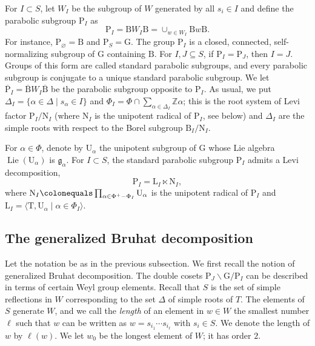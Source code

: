 \documentclass{amsart}
\theoremstyle{remark}
\numberwithin{equation}{subsection}
\newcommand{\Z}{\ZZ}
\newcommand{\ZZ}{{\mathbb Z}}
\newcommand{\ol}{\overline}
\newcommand{\sub}{\subseteq}
\DeclareMathOperator\Lie{Lie}
\newcommand{\defeq}{\colonequals}
\renewcommand{\(}{\left(}
\renewcommand{\)}{\right)}
\begin{document}
For  $I\subset S$, let $W_I$ be the subgroup of $W$ generated by all $s_i \in I$ and define the parabolic subgroup $\mathrm{P}_I$ as
$$
\mathrm{P}_I=\mathrm{B} W_I \mathrm{B}=\cup_{w\in W_I} \mathrm{B}w\mathrm{B}.
$$
For instance, $\mathrm{P}_\varnothing = \mathrm{B}$ and $\mathrm{P}_S = \mathrm{G}$. 
The group $\mathrm{P}_I$ is a closed, connected, self-normalizing subgroup of $\mathrm{G}$ containing $\mathrm{B}$. For $I,J\sub S$, if $\mathrm{P}_I=\mathrm{P}_J$, then $I=J$. Groups of this form are called standard parabolic subgroups, and every parabolic subgroup is conjugate to a unique standard parabolic subgroup. We let $\ol{\mathrm{P}}_I = \ol{\mathrm{B}} W_I \ol{\mathrm{B}}$ be the parabolic subgroup opposite to $\mathrm{P}_I$. As usual, we put $\Delta_{I}=\{\alpha \in \Delta \mid s_{\alpha}\in I \}$ and $\Phi_{I}=\Phi \cap \sum_{\alpha\in \Delta_{I}}\Z \alpha$; this is the root system of Levi factor $\mathrm{P}_{I}/\mathrm{N}_{I}$ (where $\mathrm{N}_{I}$ is the unipotent radical of $\mathrm{P}_{I}$, see below) and $\Delta_{I}$ are the simple roots with respect to the Borel subgroup $\mathrm{B}_{I}/\mathrm{N}_{I}$.

For $\alpha\in \Phi$, denote by $\mathrm{U}_{\alpha}$ the unipotent subgroup of $\mathrm{G}$ whose Lie algebra $\Lie(\mathrm{U}_\alpha)$ is $\mathfrak{g}_{\alpha}$. For $I\subset S$, the standard parabolic subgroup $\mathrm{P}_I$ admits a Levi decomposition, $$\mathrm{P}_I=\mathrm{L}_I \ltimes \mathrm{N}_I,$$ where
$\mathrm{N}_I\defeq \prod_{\alpha\in \Phi^+ - \Phi_I} \mathrm{U}_{\alpha}$ is the unipotent radical of $\mathrm{P}_{I}$ and $\mathrm{L}_I=\langle \mathrm{T},\mathrm{U}_{\alpha} \mid \alpha \in \Phi_I\rangle$.

\subsection{The generalized Bruhat decomposition}\label{generalized-Bruhat-decomposition}
Let the notation be as in the previous subsection. We first recall the notion of generalized Bruhat decomposition. The double cosets $\mathrm{P}_J \backslash \mathrm{G}/\mathrm{P}_I$ can be described in terms of certain Weyl group elements. 
Recall that $S$ is the set of simple reflections in $W$ corresponding to the set $\Delta$ of simple roots of $T$. The elements of $S$ generate $W$, and we call the \emph{length} of an element in $w \in W$ the smallest number $\ell$ such that $w$ can be written as $w = s_{i_1}\dotsm s_{i_\ell}$ with $s_i \in S$. We denote the length of $w$ by $\ell(w)$. We let $w_0$ be the longest element of $W$; it has order $2$. 
\end{document}

